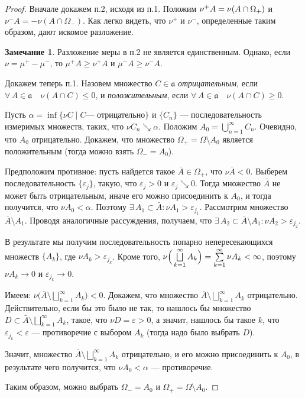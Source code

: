 \documentclass[12pt,titlepage]{article}
\theoremstyle{definition}
\newtheorem*{zam}{Замечание}
\newcommand*{\p}[1]{#1\nobreak\discretionary{}{\hbox{$\mathsurround=0pt #1$}}{}}
\begin{document}
\begin{proof}
Вначале докажем п.2, исходя из п.1. Положим $\nu^+A\p=\nu(A\cap
\Omega_+)$ и $\nu^-A=-\nu(A\cap \Omega_-)$. Как легко видеть, что
$\nu^+$ и $\nu^-$, определенные таким образом, дают искомое
разложение.

\begin{zam}
Разложение меры в п.2 не является единственным. Однако, если
$\nu=\mu^+-\mu^-$, то $\mu^+A\geqslant\nu^+A$ и
$\mu^-A\geqslant\nu^-A$.
\end{zam}

Докажем теперь п.1. Назовем множество $C\in\mathfrak{a}$
\emph{отрицательным}, если $\forall\,A\in\mathfrak{a}\quad\nu(A\cap
C)\leqslant 0$, и \emph{положительным}, если
$\forall\,A\in\mathfrak{a}\quad\nu(A\cap C)\geqslant 0$.

Пусть $\alpha=\inf\{\nu C\mid C \text{--- отрицательно}\}$ и
$\{C_n\}$ --- последовательность измеримых множеств, таких, что $\nu
C_n\searrow \alpha$. Положим $A_0=\bigcup\limits_{n=1}^\infty C_n$.
Очевидно, что $A_0$ отрицательно. Докажем, что множество
$\Omega_+=\Omega\setminus A_0$ является положительным (тогда можно
взять $\Omega_-=A_0$).

Предположим противное: пусть найдется такое $\bar{A}\in\Omega_+$,
что $\nu\bar{A}<0$. Выберем последовательность $\{\varepsilon_j\}$,
такую, что $\varepsilon_j>0$ и $\varepsilon_j\searrow 0$. Тогда
множество $\bar{A}$ не может быть отрицательным, иначе его можно
присоединить к $A_0$, и тогда получится, что $\nu A_0<\alpha$.
Поэтому $\exists\,A_1\subset \bar{A}:\nu A_1>\varepsilon_{j_1}$.
Рассмотрим множество $\bar{A}\setminus A_1$. Проводя аналогичные
рассуждения, получаем, что $\exists\,A_2\subset\bar{A}\setminus
A_1:\nu A_2>\varepsilon_{j_2}$.

В результате мы получим последовательность попарно непересекающихся
множеств $\{A_k\}$, где $\nu A_k>\varepsilon_{j_k}$. Кроме того,
$\nu\Big(\bigsqcup\limits_{k=1}^\infty
A_k\Big)=\sum\limits_{k=1}^\infty \nu A_k\p<\infty$, поэтому $\nu
A_k\to0$ и $\varepsilon_{j_k}\to0$.

Имеем: $\nu\Big(\bar{A}\setminus\bigsqcup\limits_{k=1}^\infty
A_k\Big)<0$. Докажем, что множество
$\bar{A}\setminus\bigsqcup\limits_{k=1}^\infty A_k$ отрицательно.
Действительно, если бы это было не так, то нашлось бы множество
$D\subset\bar{A}\setminus\bigsqcup\limits_{k=1}^\infty A_k$, такое,
что $\nu D=\varepsilon>0$, а значит, нашлось бы такое $k$, что
$\varepsilon_{j_k}<\varepsilon$ --- противоречие с выбором $A_k$
(тогда надо было выбрать $D$).

Значит, множество $\bar{A}\setminus\bigsqcup\limits_{k=1}^\infty
A_k$ отрицательно, и его можно присоединить к $A_0$, в результате
чего получится, что $\nu A_0<\alpha$ --- противоречие.

Таким образом, можно выбрать $\Omega_-=A_0$ и
$\Omega_+=\Omega\setminus A_0$.
\end{proof}
\end{document}
